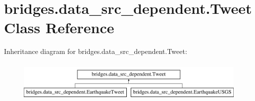 \hypertarget{classbridges_1_1data__src__dependent_1_1_tweet}{}\section{bridges.\+data\+\_\+src\+\_\+dependent.\+Tweet Class Reference}
\label{classbridges_1_1data__src__dependent_1_1_tweet}
Inheritance diagram for bridges.\+data\+\_\+src\+\_\+dependent.\+Tweet\+:\begin{figure}[H]
\begin{center}
\leavevmode
\includegraphics[height=1.992882cm]{classbridges_1_1data__src__dependent_1_1_tweet}
\end{center}
\end{figure}
